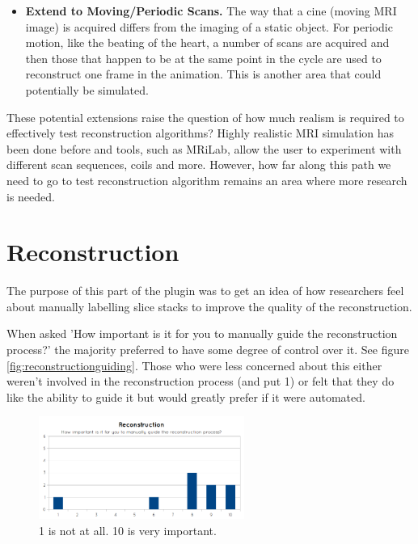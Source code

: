 \begin{itemize}
  \item \textbf{Extend to Moving/Periodic Scans.} The way that a cine (moving MRI image) is acquired differs from the imaging of a static object. For periodic motion, like the beating of the heart, a number of scans are acquired and then those that happen to be at the same point in the cycle are used to reconstruct one frame in the animation. This is another area that could potentially be simulated.
\end{itemize}

These potential extensions raise the question of how much realism is required to effectively test reconstruction algorithms? Highly realistic MRI simulation has been done before and tools, such as MRiLab\cite{mrilab}, allow the user to experiment with different scan sequences, coils and more. However, how far along this path we need to go to test reconstruction algorithm remains an area where more research is needed.

\newpage
\section{Reconstruction}
The purpose of this part of the plugin was to get an idea of how researchers feel about manually labelling slice stacks to improve the quality of the reconstruction. 

When asked 'How important is it for you to manually guide the reconstruction process?' the majority preferred to have some degree of control over it. See figure \ref{fig:reconstructionguiding}. Those who were less concerned about this either weren't involved in the reconstruction process (and put 1) or felt that they do like the ability to guide it but would greatly prefer if it were automated.

\begin{figure}[h]
    \centering
  \includegraphics[width=0.6\textwidth]{images/evaluation/graph_reconstruction_1.png}
    \caption{1 is not at all. 10 is very important.}\label{fig:graph_reconstruction_1}
\end{figure}

